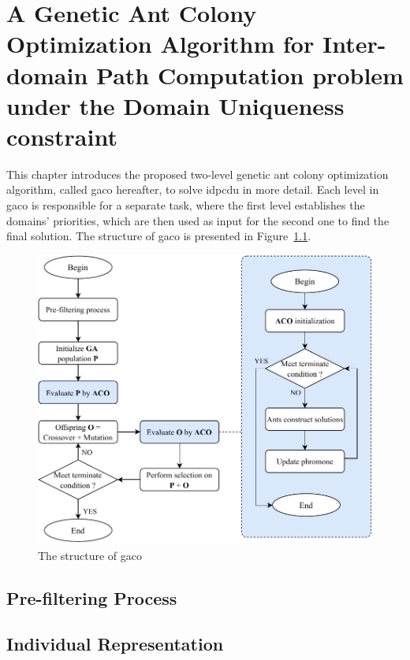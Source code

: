\chapter{A Genetic Ant Colony Optimization Algorithm for Inter-domain Path Computation problem under the Domain Uniqueness constraint}
\label{chap:chap3}
This chapter introduces the proposed two-level genetic ant colony optimization algorithm, called \acrshort{gaco} hereafter, to solve \gls{idpcdu} in more detail. Each level in \acrshort{gaco} is responsible for a separate task, where the first level establishes the domains' priorities, which are then used as input for the second one to find the final solution. The structure of \acrshort{gaco} is presented in Figure~\ref{fig:flowchart}.

\setlength{\intextsep}{3pt}
\renewcommand{\scalefigure}{1}
\begin{figure}[htbp]
	\centering
	\includegraphics[scale=\scalefigure]{Figures/chap 3/Flowchart.pdf}
	\caption{The structure of \acrshort{gaco}}
	\label{fig:flowchart}
\end{figure}

\section{Pre-filtering Process}
\label{proposed:prefiltering}


\section{Individual Representation}
\label{proposed:encoding}


